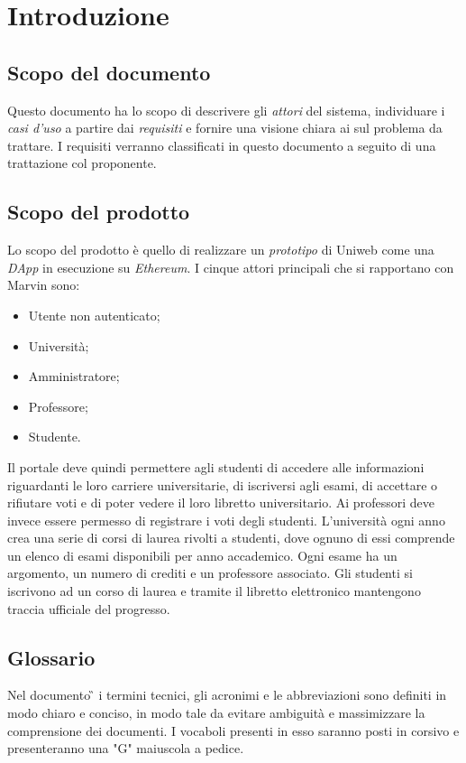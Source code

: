 \section{Introduzione}
\subsection{Scopo del documento}
Questo documento ha lo scopo di descrivere gli \emph{attori} del sistema, individuare i \emph{casi d'uso} a partire dai \emph{requisiti} e fornire una visione chiara ai \progs{} sul problema da trattare. I requisiti verranno classificati in questo documento a seguito di una trattazione col proponente.

\subsection{Scopo del prodotto}
Lo scopo del prodotto è quello di realizzare un \emph{prototipo} di Uniweb come una \emph{DApp} in esecuzione su \emph{Ethereum}. I cinque attori principali che si rapportano con Marvin sono:
\begin{itemize}
	\item Utente non autenticato; 
	\item Università;
	\item Amministratore;
	\item Professore;
	\item Studente.
\end{itemize} 
Il portale deve quindi permettere agli studenti di accedere alle informazioni riguardanti le loro carriere universitarie, di iscriversi agli esami, di accettare o rifiutare voti e di poter vedere il loro libretto universitario.
Ai professori deve invece essere permesso di registrare i voti degli studenti.
L'università ogni anno crea una serie di corsi di laurea rivolti a studenti, dove ognuno di essi comprende un elenco di esami disponibili per anno accademico. Ogni esame ha un argomento, un numero di crediti e un professore associato. Gli studenti si iscrivono ad un corso di laurea e tramite il libretto elettronico mantengono traccia ufficiale del progresso.

\subsection{Glossario}
Nel documento \G{} i termini tecnici, gli acronimi e le abbreviazioni sono definiti in modo chiaro e conciso, in modo tale da evitare ambiguità e massimizzare la comprensione dei documenti.
\newline I vocaboli presenti in esso saranno posti in corsivo e presenteranno una "G" maiuscola a pedice.
